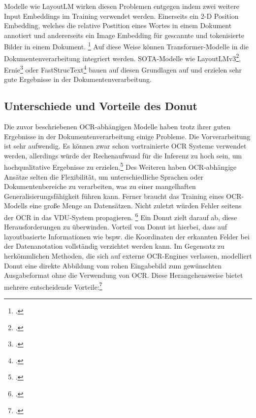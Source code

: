 Modelle wie LayoutLM wirken diesen Problemen entgegen indem zwei weitere Input Embeddings im Training verwendet werden. Einerseits ein 2-D Position Embedding, welches die relative Postition eines Wortes in einem Dokument annotiert und andererseits ein Image Embedding für gescannte und tokenisierte Bilder in einem Dokument. \footcites[Vgl.][S. 1193]{xu_layoutlm_2020} Auf diese Weise können Transformer-Modelle in die Dokumentenverarbeitung integriert werden. \ac{SOTA}-Modelle wie LayoutLMv3\footcites[Vgl. dazu ausführlich][]{huang_layoutlmv3_2022}, Ernie\footcites[Vgl. dazu ausführlich][]{peng_ernie-layout_2022} oder FastStrucText\footcites[Vgl. dazu ausführlich][]{zhai_fast-structext_2023} bauen auf diesen Grundlagen auf und erzielen sehr gute Ergebnisse in der Dokumentenverarbeitung.
\subsection{Unterschiede und Vorteile des Donut}
Die zuvor beschriebenen OCR-abhängigen Modelle haben trotz ihrer guten Ergebnisse in der Dokumentenverarbeitung einige Probleme. Die Vorverarbeitung ist sehr aufwendig. Es können zwar schon vortrainierte OCR Systeme verwendet werden, allerdings würde der Rechenaufwand für die Inferenz zu hoch sein, um hochqualitative Ergebnisse zu erzielen.\footcites[Vgl.][S. 2]{kim_ocr-free_2021} Des Weiteren haben OCR-abhängige Ansätze selten die Flexibilität, um unterschiedliche Sprachen oder Dokumentenbereiche zu verarbeiten, was zu einer mangelhaften Generalisierungsfähigkeit führen kann. Ferner braucht das Training eines OCR-Modells eine große Menge an Datensätzen. Nicht zuletzt würden Fehler seitens der OCR in das \ac{VDU}-System propagieren. \footcites[Vgl.][S. 2]{kim_ocr-free_2021} Ein 
Donut zielt darauf ab, diese Herausforderungen zu überwinden. Vorteil von Donut ist hierbei, dass auf layoutbasierte Informationen wie bspw. die Koordinaten der erkannten Felder bei der Datenanotation vollständig verzichtet werden kann. Im Gegensatz zu herkömmlichen Methoden, die sich auf externe OCR-Engines verlassen, modelliert Donut eine direkte Abbildung vom rohen Eingabebild zum gewünschten Ausgabeformat ohne die Verwendung von OCR. Diese Herangehensweise bietet mehrere entscheidende Vorteile:\footcites[Vgl.][S. 3]{kim_ocr-free_2021}
